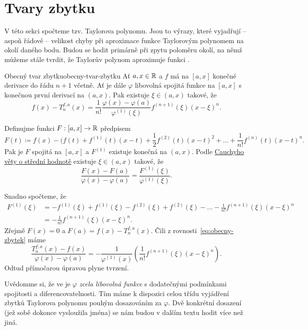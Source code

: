\section{Tvary zbytku}
\label{sec:tvary-zbytku}

V této sekci spočteme tzv.  Taylorova polynomu. Jsou to výrazy,
které vyjadřují -- aspoň řádově -- velikost chyby při aproximace funkce
Taylorovým polynomem na okolí daného bodu. Budou se hodit primárně při zpytu
poloměru okolí, na němž můžeme stále tvrdit, že Taylorův polynom aproximuje
funkci .

\begin{theorem}{Obecný tvar zbytku}{obecny-tvar-zbytku}
 Ať $a, x \in \mathbb{R}$ a $f$ má na $[a,x]$ konečné derivace do řádu $n+1$ včetně. Ať
 je dále $\varphi$ libovolná spojitá funkce na $[a,x]$ s konečnou první derivací
 na $(a,x)$. Pak existuje $\xi \in (a,x)$ takové, že
 \[
  f(x) - T^{f,a}_n(x) = \frac{1}{n!}\frac{\varphi(x) -
  \varphi(a)}{\varphi^{(1)}(\xi)}f^{(n+1)}(\xi)(x-\xi)^{n}.
 \]
\end{theorem}
\begin{thmproof}
 Definujme funkci $F: [a,x] \to \mathbb{R}$ předpisem
 \[
  F(t) \coloneqq f(x) - (f(t) + f^{(1)}(t)(x-t) + \frac{1}{2}f^{(2)}(t)(x-t)^2 +
  \ldots + \frac{1}{n!}f^{(n)}(t)(x-t)^{n}.
 \]
 Pak je $F$ spojitá na $[a,x]$ a $F^{(1)}$ existuje konečná na $(a,x)$. Podle
 \hyperref[thm:cauchyho-o-stredni-hodnote]{Cauchyho věty o střední hodnotě}
 existuje $\xi \in (a,x)$ takové, že
 \begin{equation}
  \label{eq:obecny-zbytek}
  \tag{$\diamondsuit$}
  \frac{F(x) - F(a)}{\varphi(x) - \varphi(a)} =
  \frac{F^{(1)}(\xi)}{\varphi^{(1)}(\xi)}.
 \end{equation}
 
 Snadno spočteme, že
 \begin{align*}
  F^{(1)}(\xi) &= -f^{(1)}(\xi) + f^{(1)}(\xi) - f^{(2)}(\xi) + f^{(2)}(\xi) -
  \ldots - \frac{1}{n!}f^{(n+1)}(\xi)(x-\xi)^{n}\\
               &= -\frac{1}{n!}f^{(n+1)}(\xi)(x - \xi)^{n}.
 \end{align*}
 Zřejmě $F(x) = 0$ a $F(a) = f(x) - T^{f,a}_n(x)$. Čili z
 rovnosti~\eqref{eq:obecny-zbytek} máme
 \[
  \frac{T^{f,a}_n(x) - f(x)}{\varphi(x) - \varphi(a)} =
  -\frac{1}{\varphi^{(1)}(x)} \left( \frac{1}{n!} f^{(n+1)}(\xi)(x-\xi)^{n}
  \right).
 \]
 Odtud přímočarou úpravou plyne tvrzení.
\end{thmproof}

Uvědomme si, že ve  je $\varphi$ \emph{zcela
libovolná funkce} s dodatečnými podmínkami spojitosti a diferencovatelnosti. Tím
máme k dispozici celou třídu vyjádření zbytků Taylorova polynomu pouhým
dosazováním za $\varphi$. Dvě konkrétní dosazení (jež sobě dokonce vysloužila
jména) se nám budou v dalším textu hodit více než jiná.

